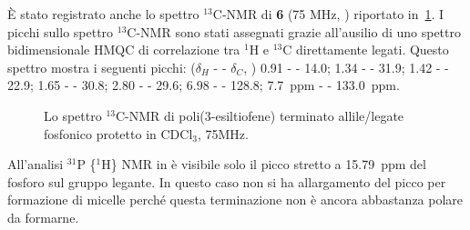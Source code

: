 È stato registrato anche lo spettro $^{13}$C-NMR di {\bf 6} (75 MHz, )  {
  riportato in~\ref{fig:P3HT-leg-CNMR}. I picchi sullo spettro $^{13}$C-NMR sono stati assegnati grazie all'ausilio di uno spettro bidimensionale HMQC di correlazione tra $^1$H e $^{13}$C direttamente legati. Questo spettro mostra i seguenti picchi: ($\delta_H$ - -  $\delta_C$, ) 0.91 - - 14.0; 1.34 - - 31.9;  1.42 - - 22.9; 1.65 - - 30.8; 2.80 - - 29.6; 6.98 - - 128.8; 7.7~ppm - - 133.0~ppm. }
\begin{figure}
\caption{\footnotesize{Lo spettro $^{13}$C-NMR di poli(3-esiltiofene) terminato allile/legate fosfonico protetto in CDCl$_3$, 75MHz.}
\label{fig:P3HT-leg-CNMR}}
\end{figure}

All'analisi $^{31}$P \{$^1$H\} NMR in  è visibile solo il picco stretto a 15.79~ppm {
del fosforo sul gruppo legante. In questo caso non si ha allargamento del picco per formazione di micelle perché questa terminazione non è ancora abbastanza polare da formarne.}



